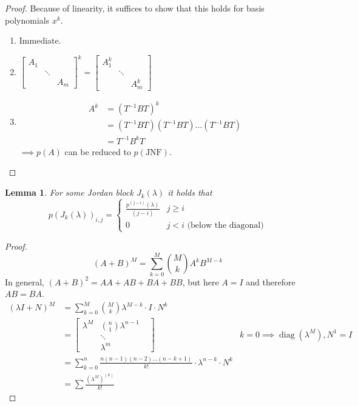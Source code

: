 \documentclass{article}
\newtheorem{lemma}{Lemma}  \numberwithin{lemma}{section}
\DeclareMathOperator{\diag}{diag}
\begin{document}
\begin{proof}
  Because of linearity, it suffices to show that this holds for basis polynomials $x^k$.
  \begin{enumerate}
    \item Immediate.
    \item $\begin{bmatrix} A_1 & & \\ & \ddots & \\ & & A_m \end{bmatrix}^k = \begin{bmatrix} A_1^k & & \\ & \ddots & \\ & & A_m^k \end{bmatrix}$
    \item
      \begin{align*}
        A^k &= (T^{-1} BT)^k \\
            &= (T^{-1} BT)(T^{-1} BT) \dots (T^{-1} BT) \\
            &= T^{-1} B^k T
      \end{align*}
      $\implies p(A)$ can be reduced to $p(\text{JNF})$.
  \end{enumerate}
\end{proof}

\begin{lemma} %
  For some Jordan block $J_k(\lambda)$ it holds that
  \[
    p(J_k(\lambda))_{i,j} = \begin{cases}
      \frac{p^{(j - i)}(\lambda)}{(j - i)} & j \geq i \\
      0 & j < i \text{ (below the diagonal)}
    \end{cases}
  \]
\end{lemma}

\begin{proof}
  \[ (A + B)^M = \sum_{k=0}^M {M \choose k} A^k B^{M - k} \]
  In general, $(A + B)^2 = AA + AB + BA + BB$, but here $A = I$ and therefore $AB = BA$.
  \begin{align*}
    (\lambda I + N)^M
      &= \sum_{k=0}^M {M \choose k} \lambda^{M-k} \cdot I \cdot N^k \\
      &= \begin{bmatrix} \lambda^M & {n \choose 1} \lambda^{n-1} & \\ & \ddots & \\ & \lambda^m & \end{bmatrix} & k=0 \implies \diag(\lambda^M), N^1 = I \\
      &= \sum_{k=0}^n \frac{n (n-1)(n-2) \dots (n-k+1)}{k!} \cdot \lambda^{n-k} \cdot N^k \\
      &= \sum \frac{(\lambda^M)^{(k)}}{k!}
  \end{align*}
\end{proof}
\end{document}
